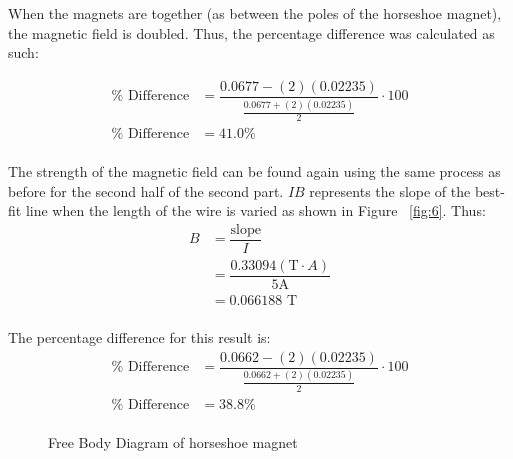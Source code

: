 \documentclass [12pt, letterpaper, twoside] {article}
\begin{document}
\noindent
When the magnets are together (as between the poles of the horseshoe magnet), the magnetic field is doubled. Thus, the percentage difference was calculated as such:

\begin{equation*}
  \begin{split}
    \%\text{ Difference} &= \dfrac{0.0677 - (2)(0.02235)}{\tfrac{0.0677 + (2)(0.02235)}{2}}\cdot{100} \\
    \%\text{ Difference} &= 41.0\% \\ %
  \end{split}
\end{equation*}

\noindent
The strength of the magnetic field can be found again using the same process as before for the second half of the second part. \(IB\) represents the slope of the best-fit line when the length of the wire is varied as shown in Figure ~\ref{fig:6}. Thus:
\begin{equation*}
  \begin{split}
    B &= \dfrac{\text{slope}}{I} \\
      &= \dfrac{0.33094(\text{T}\cdot{A})}{5\text{A}} \\  
      &= 0.066188\text{ T} \\
  \end{split}
\end{equation*}

\noindent
The percentage difference for this result is:
\begin{equation*}
  \begin{split}
    \%\text{ Difference} &= \dfrac{0.0662 - (2)(0.02235)}{\tfrac{0.0662 + (2)(0.02235)}{2}}\cdot{100} \\
    \%\text{ Difference} &= 38.8\% \\ %
  \end{split}
\end{equation*}

\begin{figure}
  \centering
  \caption{Free Body Diagram of horseshoe magnet}
  \label{fig:4}
\end{figure}
\end{document}
